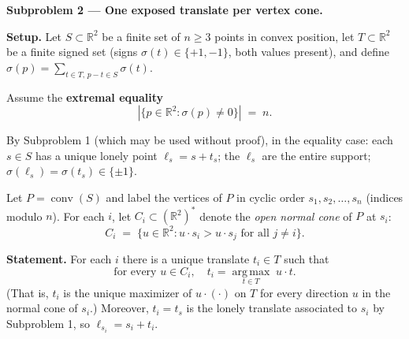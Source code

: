 \documentclass{article}
\begin{document}
\textbf{Subproblem 2 --- One exposed translate per vertex cone.}

\medskip
\textbf{Setup.}
Let $S\subset\mathbb{R}^2$ be a finite set of $n\ge 3$ points in convex position,
let $T\subset\mathbb{R}^2$ be a finite signed set (signs $\sigma(t)\in\{+1,-1\}$,
both values present), and define $\sigma(p)=\sum_{t\in T,\,p-t\in S}\sigma(t)$.

Assume the \textbf{extremal equality}
\[
  |\{p\in\mathbb{R}^2:\sigma(p)\neq 0\}| \;=\; n.
\]

By Subproblem 1 (which may be used without proof), in the equality case:
each $s\in S$ has a unique lonely point $\ell_s=s+t_s$; the $\ell_s$ are the entire support;
$\sigma(\ell_s)=\sigma(t_s)\in\{\pm 1\}$.

Let $P=\operatorname{conv}(S)$ and label the vertices of $P$ in cyclic order
$s_1,s_2,\dots,s_n$ (indices modulo $n$).
For each $i$, let $C_i\subset(\mathbb{R}^2)^*$ denote the \emph{open normal cone} of $P$ at $s_i$:
\[
  C_i \;=\; \{u\in\mathbb{R}^2 : u\cdot s_i > u\cdot s_j \text{ for all } j\neq i\}.
\]

\medskip
\textbf{Statement.}
For each $i$ there is a unique translate $t_i\in T$ such that
\[
  \text{for every } u\in C_i,\quad t_i = \operatorname*{arg\,max}_{t\in T}\; u\cdot t.
\]
(That is, $t_i$ is the unique maximizer of $u\cdot(\cdot)$ on $T$ for every direction
$u$ in the normal cone of $s_i$.)
Moreover, $t_i=t_s$ is the lonely translate associated to $s_i$ by Subproblem 1,
so $\ell_{s_i}=s_i+t_i$.
\end{document}
